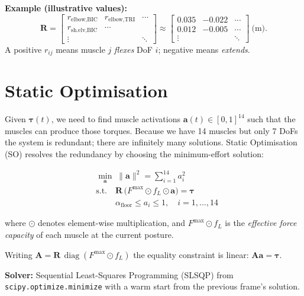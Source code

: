 \documentclass[11pt,a4paper]{article}
\begin{document}
\textbf{Example (illustrative values):}
\[
  \mathbf{R} = \begin{bmatrix}
    r_{\text{elbow},\text{BIC}} & r_{\text{elbow},\text{TRI}} & \cdots \\
    r_{\text{sh.elv},\text{BIC}} & \cdots & \\
    \vdots & & \ddots
  \end{bmatrix}
  \approx \begin{bmatrix}
    0.035 & -0.022 & \cdots \\
    0.012 & -0.005 & \cdots \\
    \vdots & & \ddots
  \end{bmatrix}\ \text{(m)}.
\]
A positive $r_{ij}$ means muscle $j$ \emph{flexes} DoF $i$; negative means
\emph{extends}.

\section{Static Optimisation}

Given $\bm{\tau}(t)$, we need to find muscle activations
$\bm{a}(t)\in[0,1]^{14}$ such that the muscles can produce those torques.
Because we have 14 muscles but only 7 DoFs the system is redundant; there
are infinitely many solutions. Static Optimisation (SO) resolves the
redundancy by choosing the minimum-effort solution:

\[
  \boxed{
    \begin{aligned}
      &\min_{\bm{a}}\; \|\bm{a}\|^2 = \sum_{i=1}^{14} a_i^2 \\
      &\text{s.t.}\quad \mathbf{R}\,\bigl(F^\text{max}\odot f_L \odot \bm{a}\bigr) = \bm{\tau} \\
      &\phantom{\text{s.t.}\quad} \alpha_\text{floor} \le a_i \le 1, \quad i=1,\ldots,14
    \end{aligned}
  }
\]

where $\odot$ denotes element-wise multiplication, and
$F^\text{max}\odot f_L$ is the \emph{effective force capacity} of each
muscle at the current posture.

Writing $\mathbf{A} = \mathbf{R}\,\operatorname{diag}(F^\text{max}\odot f_L)$
the equality constraint is linear: $\mathbf{A}\bm{a} = \bm{\tau}$.

\textbf{Solver:} Sequential Least-Squares Programming (SLSQP) from
\texttt{scipy.optimize.minimize} with a warm start from the previous
frame's solution.
\end{document}
